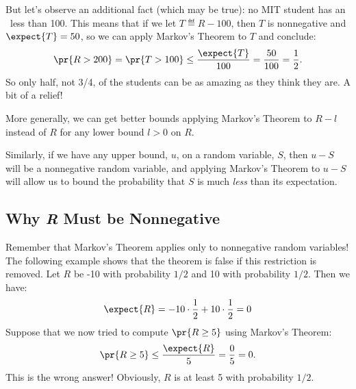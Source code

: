 But let's observe an additional fact (which may be true): no MIT student
has an \IQ\ less than 100.  This means that if we let $T \eqdef R-100$,
then $T$ is nonnegative and $\expect{T} = 50$, so we can apply Markov's
Theorem to $T$ and conclude:
\[
\pr{R > 200} = \pr{T > 100} \leq \frac{\expect{T}}{100}= \frac{50}{100} =
\frac{1}{2}.
\]
So only half, not 3/4, of the students can be as amazing as they think
they are.  A bit of a relief!

More generally, we can get better bounds applying Markov's Theorem to
$R-l$ instead of $R$ for any lower bound $l>0$ on $R$.

Similarly, if we have any upper bound, $u$, on a random variable, $S$,
then $u-S$ will be a nonnegative random variable, and applying Markov's
Theorem to $u-S$ will allow us to bound the probability that $S$ is much
\emph{less} than its expectation.

\iffalse
\subsection{Why \emph{R} Must be Nonnegative}

Remember that Markov's Theorem applies only to nonnegative random
variables!  The following example shows that the theorem is false if this
restriction is removed.  Let $R$ be -10 with probability $1/2$ and 10 with
probability $1/2$.  Then we have:
\[
\expect{R} = -10 \cdot \frac{1}{2} + 10 \cdot \frac{1}{2} = 0
\]
Suppose that we now tried to compute $\pr{R \geq 5}$ using Markov's
Theorem:
\begin{displaymath}
  \pr{R \geq 5} \leq \frac{\expect{R}}{5} = \frac{0}{5} = 0.
\end{displaymath}
This is the wrong answer!  Obviously, $R$ is at least 5 with
probability $1/2$.  

